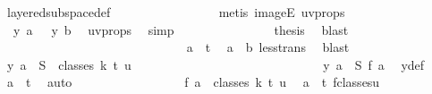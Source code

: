 \begin{isabellebody}
\ layered{\isacharunderscore}{\kern0pt}subspace{\isacharunderscore}{\kern0pt}def\ \isanewline
\ \ \ \ \ \ \ \ \ \ \ \ \ \ \isamarkupfalse%
\ {\isacharparenleft}{\kern0pt}metis\ imageE\ uv{\isacharunderscore}{\kern0pt}props{\isacharparenright}{\kern0pt}\isanewline
\ \ \ \ \ \ \ \ \ \ \ \ \isamarkupfalse%
\ \isamarkupfalse%
\ {\isachardoublequoteopen}{\isasymchi}\ {\isacharparenleft}{\kern0pt}y\ a{\isacharparenright}{\kern0pt}\ {\isacharequal}{\kern0pt}\ {\isasymchi}\ {\isacharparenleft}{\kern0pt}y\ b{\isacharparenright}{\kern0pt}{\isachardoublequoteclose}\ \isamarkupfalse%
\ uv{\isacharunderscore}{\kern0pt}props\ \isamarkupfalse%
\ simp\isanewline
\ \ \ \ \ \ \ \ \ \ \ \ \isamarkupfalse%
\ \isamarkupfalse%
\ {\isacharquery}{\kern0pt}thesis\ \isamarkupfalse%
\ blast\isanewline
\ \ \ \ \ \ \ \ \ \ \isamarkupfalse%
\isanewline
\ \ \ \ \ \ \ \ \ \ \ \ \isamarkupfalse%
\ {}\isanewline
\ \ \ \ \ \ \ \ \ \ \ \ \isamarkupfalse%
\ \isamarkupfalse%
\ {\isachardoublequoteopen}a\ {\isacharless}{\kern0pt}\ t{\isachardoublequoteclose}\ \isamarkupfalse%
\ {\isacartoucheopen}a\ {\isacharless}{\kern0pt}\ b{\isacartoucheclose}\ less{\isacharunderscore}{\kern0pt}trans\ \isamarkupfalse%
\ blast\isanewline
\ \ \ \ \ \ \ \ \ \ \ \ \isamarkupfalse%
\ \isamarkupfalse%
\ {\isachardoublequoteopen}y\ a\ {\isasymin}\ S\ {\isacharbackquote}{\kern0pt}\ classes\ k\ t\ u{\isachardoublequoteclose}\isanewline
\ \ \ \ \ \ \ \ \ \ \ \ \isamarkupfalse%
\ {\isacharminus}{\kern0pt}\isanewline
\ \ \ \ \ \ \ \ \ \ \ \ \ \ \isamarkupfalse%
\ {\isachardoublequoteopen}y\ a\ {\isacharequal}{\kern0pt}\ S\ {\isacharparenleft}{\kern0pt}{\isacharquery}{\kern0pt}f\ a{\isacharparenright}{\kern0pt}{\isachardoublequoteclose}\ \isamarkupfalse%
\ y{\isacharunderscore}{\kern0pt}def\ \isamarkupfalse%
\ {\isacartoucheopen}a\ {\isacharless}{\kern0pt}\ t{\isacartoucheclose}\ \isamarkupfalse%
\ auto\isanewline
\ \ \ \ \ \ \ \ \ \ \ \ \ \ \isamarkupfalse%
\ \isamarkupfalse%
\ {\isachardoublequoteopen}{\isacharquery}{\kern0pt}f\ a\ {\isasymin}\ classes\ k\ t\ u{\isachardoublequoteclose}\ \isamarkupfalse%
\ {\isacartoucheopen}a\ {\isacharless}{\kern0pt}\ t{\isacartoucheclose}\ f{\isacharunderscore}{\kern0pt}classes{\isacharunderscore}{\kern0pt}u\ \isamarkupfalse%

\end{isabellebody}
